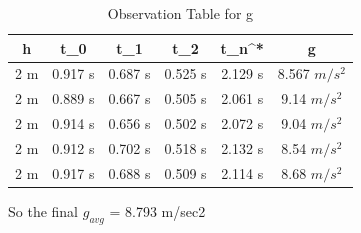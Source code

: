 \documentclass[11pt]{scrartcl} %
\begin{document}
\begin{table}[h]
\centering
\begin{tabular}{||c c c c c c||} 
\toprule
 \hline
 h & t_0 & t_1 & t_2 & t_n^* & g \\ [0.5ex] 
 \midrule
 \hline\hline
 2 m & 0.917 s & 0.687 s  & 0.525 s & 2.129 s & 8.567 $m/s^2$  \\ 
 \hline
 2 m & 0.889 s & 0.667 s & 0.505 s & 2.061 s & 9.14 $m/s^2$  \\
 \hline 
 2 m & 0.914 s & 0.656 s & 0.502 s & 2.072 s  & 9.04 $m/s^2$   \\
 \hline
 2 m & 0.912 s & 0.702 s & 0.518 s & 2.132 s  & 8.54 $m/s^2$   \\
 \hline
 2 m & 0.917 s & 0.688 s & 0.509 s & 2.114 s  & 8.68 $m/s^2$  \\ 
 [1ex]
 \bottomrule
 \hline
\end{tabular}
\caption{Observation Table for g}
\end{table}
So the final $g_{avg}$ = 8.793 m/sec2
\end{document}
